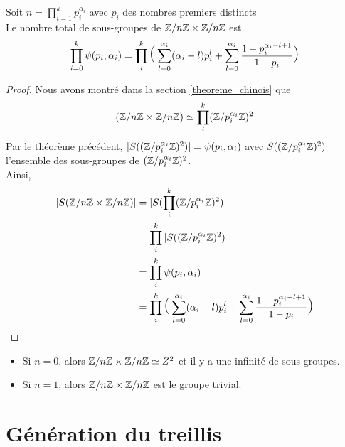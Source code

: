 \documentclass[12pt]{article}
\newcommand{\ZnZ}{\Z/n\Z}
\newcommand{\ZZ}{\ZnZ \x \ZnZ}
\begin{document}
\begin{proposition}
	Soit $n = \prod\limits_{i = 1}^k p_i^{\alpha_i}$ avec $p_i$ des nombres premiers distincts\\
	Le nombre total de sous-groupes de $\ZZ$ est
	$$\prod_{i = 0}^{k} \psi(p_i,\alpha_i)
		= \prod_i^k\mlarge[3](\sum_{l=0}^{\alpha_i}(\alpha_i-l)p_i^l +%
		\sum_{l = 0}^{\alpha_i}\frac{1- p_i^{\alpha_i-l+1}}{1 - p_i}\mlarge[3])$$
\end{proposition}

\begin{proof}
	Nous avons montré dans la section \ref{theoreme_chinois} que
	$$(\ZZ) \isom \prod_i^k(\Z/p_i^{\alpha_i}\Z)^2$$
	Par le théorème précédent, $|S((\mathbb Z/p_i^{\alpha_i}\mathbb Z)^2)| = \psi(p_i, \alpha_i)$ avec
	$S((\mathbb Z/p_i^{\alpha_i}\mathbb Z)^2)$ l'ensemble des sous-groupes de $(\mathbb Z/p_i^{\alpha_i}\mathbb Z)^2$.\\
	Ainsi,
	\begin{equation*}
		\begin{split}
			|S(\ZZ)| &= |S(\prod_i^k(\Z/p_i^{\alpha_i}\Z)^2)|\\
			&= \prod_i^k|S((\Z/p_i^{\alpha_i}\Z)^2)\\
			&= \prod_i^k\psi(p_i,\alpha_i)\\
			&= \prod_i^k\mlarge[3](\sum_{l=0}^{\alpha_i}(\alpha_i-l)p_i^l +%
			\sum_{l = 0}^{\alpha_i}\frac{1- p_i^{\alpha_i-l+1}}{1 - p_i}\mlarge[3])
		\end{split}
	\end{equation*}
\end{proof}

\begin{remark}
	\hfill
	\begin{itemize}
		\item Si $n = 0$, alors $\ZZ \isom Z^2$ et il y a une infinité de sous-groupes.
		\item Si $n = 1$, alors $\ZZ$ est le groupe trivial.
	\end{itemize}

\end{remark}
\newpage
\section{Génération du treillis}

\newpage
\end{document}
